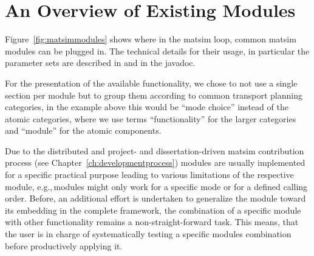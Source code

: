 

\section{An Overview of Existing Modules}
Figure~\ref{fig:matsimmodules} shows where in the \gls{matsim} loop, common \gls{matsim} modules can be plugged in. The technical details for their usage, in particular the parameter sets are described in \citep[][]{MATSim_Userguide_2014} and in the javadoc.

For the presentation of the available functionality, we chose to not use a single section per module but to group them according to common transport planning categories, in the example above this would be ``mode choice'' instead of the atomic categories, where we use terms ``functionality'' for the larger categories and ``module'' for the atomic components. %

Due to the distributed and project- and dissertation-driven \gls{matsim} contribution process (see Chapter~\ref{ch:developmentprocess}) modules are usually implemented for a specific practical purpose leading to various limitations of the respective module, e.g.,\,modules might only work for a specific mode or for a defined calling order. Before, an additional effort is undertaken to generalize the module toward its embedding in the complete framework, the combination of a specific module with other functionality remains a non-straight-forward task. This means, that the user is in charge of systematically testing a specific modules combination before productively applying it.

